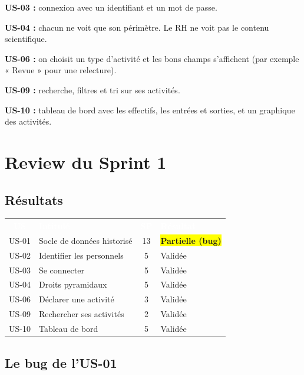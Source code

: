 \documentclass[11pt,a4paper]{article}
\newcommand{\entete}[1]{\textcolor{white}{\textbf{#1}}}
\begin{document}
\textbf{US-03 :} connexion avec un identifiant et un mot de passe.

\textbf{US-04 :} chacun ne voit que son périmètre. Le RH ne voit pas le contenu scientifique.

\textbf{US-06 :} on choisit un type d'activité et les bons champs s'affichent (par exemple « Revue » pour une relecture).

\textbf{US-09 :} recherche, filtres et tri sur ses activités.

\textbf{US-10 :} tableau de bord avec les effectifs, les entrées et sorties, et un graphique des activités.

\newpage

\section{Review du Sprint 1}

\subsection{Résultats}

\begin{center}
\begin{tabular}{c p{7cm} c l}
\rowcolor{bleu} \entete{US} & \entete{Intitulé} & \entete{SP} & \entete{Résultat} \\
US-01 & Socle de données historisé & 13 & \colorbox{yellow}{\textbf{Partielle (bug)}} \\
\rowcolor{grisclair} US-02 & Identifier les personnels & 5 & Validée \\
US-03 & Se connecter & 5 & Validée \\
\rowcolor{grisclair} US-04 & Droits pyramidaux & 5 & Validée \\
US-06 & Déclarer une activité & 3 & Validée \\
\rowcolor{grisclair} US-09 & Rechercher ses activités & 2 & Validée \\
US-10 & Tableau de bord & 5 & Validée \\
\end{tabular}
\end{center}

\subsection{Le bug de l'US-01}
\end{document}
